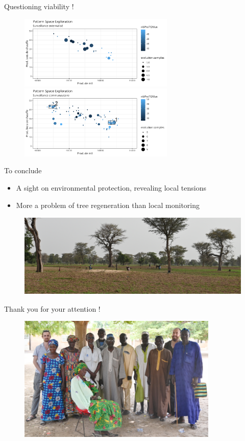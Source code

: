 \documentclass[aspectratio=169]{beamer}
\begin{document}
\begin{frame}{Questioning viability !}
    \begin{figure}
        \centering
        \includegraphics[height = 3.5cm]{img/om_pse_sReprez.png}~
        \includegraphics[height = 3.5cm]{img/om_pse_sPop.png}
    \end{figure}
\end{frame}

\begin{frame}{To conclude }
    \begin{itemize}
        \item A sight on environmental protection, revealing local tensions
        \item More a problem of tree regeneration than local monitoring
    \end{itemize}
    \begin{figure}
        \centering
        \includegraphics[height = 4cm]{img/end.JPG}
    \end{figure}
\end{frame}

\begin{frame}{Thank you for your attention !}
    \begin{figure}
        \centering
        \includegraphics[height = 6cm]{img/photo_groupe.JPG}
    \end{figure}
\end{frame}
\end{document}
